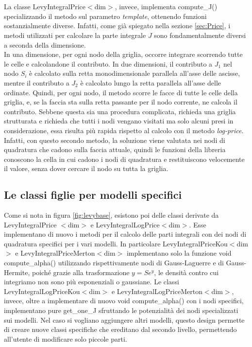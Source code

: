 \documentclass[a4paper,10pt]{report}
\theoremstyle{plain}
\theoremstyle{definition}
\theoremstyle{remark}
\begin{document}
\\\\
La classe \textsf{LevyIntegralPrice$<$dim$>$}, invece, implementa \textsf{compute\_J()} specializzando il metodo sul parametro \emph{template}, ottenendo funzioni sostanzialmente diverse. Infatti, come già spiegato nella sezione \ref{sec:Price}, i metodi utilizzati per calcolare la parte integrale $J$ sono fondamentalmente diversi a seconda della dimensione.\\In una dimensione, per ogni nodo della griglia, occorre integrare scorrendo tutte le celle e calcolandone il contributo. In due dimensioni, il contributo a $J_1$ nel nodo $S_i$ è calcolato sulla retta monodimensionale parallela all'asse delle ascisse, mentre il contributo a $J_2$ è calcolato lungo la retta parallela all'asse delle ordinate. Quindi, per ogni nodo, il metodo scorre le facce di tutte le celle della griglia, e, se la faccia sta sulla retta passante per il nodo corrente, ne calcola il contributo. Sebbene questa sia una procedura complicata, richieda una griglia strutturata e richieda che tutti i nodi vengano visitati ma solo alcuni presi in considerazione, essa risulta più rapida rispetto al calcolo con il metodo \emph{log-price}. Infatti, con questo secondo metodo, la soluzione viene valutata nei nodi di quadratura che cadono sulla faccia attuale, quindi le funzioni della libreria conoscono la cella in cui cadono i nodi di quadratura e restituiscono velocemente il valore, senza dover cercare il nodo su tutta la griglia.

\subsection{Le classi figlie per modelli specifici}

Come si nota in figura \ref{fig:levybase}, esistono poi delle classi derivate da \textsf{LevyIntegralPrice $<$dim$>$} e \textsf{LevyIntegralLogPrice$<$dim$>$}. Esse implementano di nuovo i metodi per il calcolo delle parti integrali con dei nodi di quadratura specifici per i vari modelli. In particolare \textsf{LevyIntegralPriceKou$<$dim$>$} e \textsf{LevyIntegralPriceMerton$<$dim$>$} implementano solo la funzione \textsf{void compute\_alpha()} utilizzando rispettivamente nodi di Gauss-Laguerre e di Gauss-Hermite, poich\'e grazie alla trasformazione $y=Se^y$, le densit\`a contro cui integriamo non sono pi\`u esponenziali o gaussiane. Le classi \textsf{LevyIntegralLogPriceKou$<$dim$>$} e {LevyIntegralLogPriceMerton$<$dim$>$}, invece, oltre a implementare di nuovo \textsf{void compute\_alpha()} con i nodi specifici, implementano pure \textsf{get\_one\_J} sfruttando le potenzialit\`a dei nodi specializzati sui modelli. Nel caso si vogliano aggiungere altri modelli, questo design permette di creare nuove classi specifiche che ereditano dal secondo livello, permettendo all'utente di modificare solo piccole parti.
\end{document}

